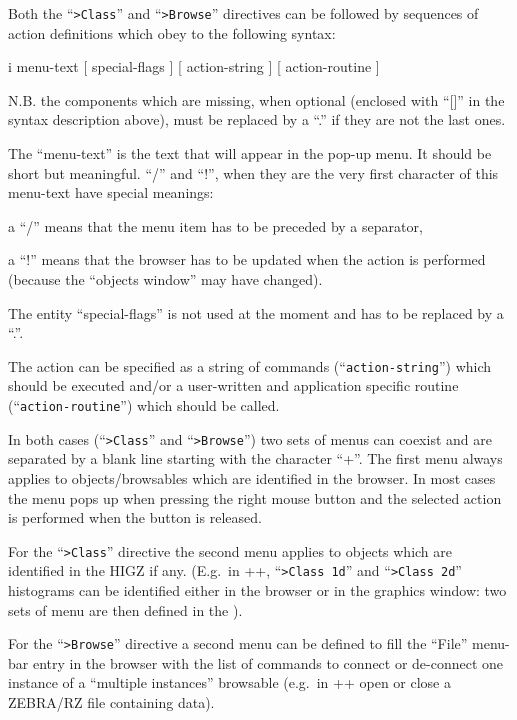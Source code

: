 Both the ``{\tt >Class}'' and ``{\tt >Browse}'' directives can be followed 
by sequences of action definitions which obey to the following syntax:
\begin{Gray}{i}
menu-text  [ special-flags ]  [ action-string ]  [ action-routine ]
\end{Gray}
N.B. the components which are missing, when optional (enclosed with ``[]'' 
in the syntax description above), must be replaced by a ``.'' if they are
not the last ones.

The ``menu-text'' is the text that will appear in the pop-up menu. It should
be short but meaningful. ``/'' and ``!'', when they are the very first 
character of this menu-text have special meanings:
\begin{UL}
\item
a ``/'' means that the menu item has to be preceded by a separator,
\item
a ``!'' means that the browser has to be updated when the action is
performed (because the ``objects window'' may have changed).
\end{UL}

The entity ``special-flags'' is not used at the moment and has to be
replaced by a ``.''.

The action can be specified as a string of commands (``{\tt action-string}'')
which should be executed and/or a user-written and application specific 
routine (``{\tt action-routine}'') which should be called. 

In both cases (``{\tt >Class}'' and ``{\tt >Browse}'') two sets of menus 
can coexist and are separated by a blank line starting with the 
character ``+''. The first menu always applies to objects/browsables 
which are identified in the browser. In most cases the
menu pops up when pressing the right mouse button and the selected
action is performed when the button is released.

For the ``{\tt >Class}'' directive the second menu applies to objects which 
are identified in the HIGZ \GW{} if any. (E.g.\ in \PAW++{}, 
``{\tt >Class 1d}'' and ``{\tt >Class 2d}'' histograms can be 
identified either in the browser or in the graphics window: two sets of
menu are then defined in the \CDF{}). 

For the ``{\tt >Browse}'' directive a second menu can be defined to fill 
the ``File'' menu-bar entry in the browser with the list of commands to 
connect or de-connect one instance of a ``multiple instances'' browsable 
(e.g.\ in \PAW++{} open or close a ZEBRA/RZ file containing \HBOOK{} data). 

